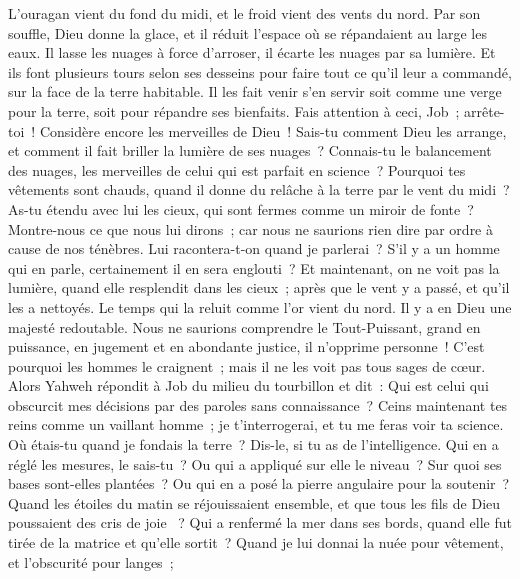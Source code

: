 \begin{multicols}{2}
L'ouragan vient du fond du midi, et le froid vient des vents du nord.
Par son souffle, Dieu donne la glace, et il réduit l'espace où se répandaient au large les eaux.
Il lasse les nuages à force d'arroser, il écarte les nuages par sa lumière.
Et ils font plusieurs tours selon ses desseins pour faire tout ce qu'il leur a commandé, sur la face de la terre habitable.
Il les fait venir s'en servir soit comme une verge pour la terre, soit pour répandre ses bienfaits.
Fais attention à ceci, Job~; arrête-toi~! Considère encore les merveilles de Dieu~!
Sais-tu comment Dieu les arrange, et comment il fait briller la lumière de ses nuages~?
Connais-tu le balancement des nuages, les merveilles de celui qui est parfait en science~?
Pourquoi tes vêtements sont chauds, quand il donne du relâche à la terre par le vent du midi~? 
As-tu étendu avec lui les cieux, qui sont fermes comme un miroir de fonte~? 
Montre-nous ce que nous lui dirons~; car nous ne saurions rien dire par ordre à cause de nos ténèbres. 
Lui racontera-t-on quand je parlerai~? S'il y a un homme qui en parle, certainement il en sera englouti~?
Et maintenant, on ne voit pas la lumière, quand elle resplendit dans les cieux~; après que le vent y a passé, et qu'il les a nettoyés.
Le temps qui la reluit comme l'or vient du nord. Il y a en Dieu une majesté redoutable.
Nous ne saurions comprendre le Tout-Puissant, grand en puissance, en jugement et en abondante justice, il n'opprime personne~!
C'est pourquoi les hommes le craignent~; mais il ne les voit pas tous sages de cœur.
\VerseOne{}Alors Yahweh répondit à Job du milieu du tourbillon et dit~:
Qui est celui qui obscurcit mes décisions par des paroles sans connaissance~?
Ceins maintenant tes reins comme un vaillant homme~; je t'interrogerai, et tu me feras voir ta science.
Où étais-tu quand je fondais la terre~? Dis-le, si tu as de l'intelligence.
Qui en a réglé les mesures, le sais-tu~? Ou qui a appliqué sur elle le niveau~?
Sur quoi ses bases sont-elles plantées~? Ou qui en a posé la pierre angulaire pour la soutenir~?
Quand les étoiles du matin se réjouissaient ensemble, et que tous les fils de Dieu poussaient des cris de joie ~?
Qui a renfermé la mer dans ses bords, quand elle fut tirée de la matrice et qu'elle sortit~? 
Quand je lui donnai la nuée pour vêtement, et l'obscurité pour langes~;

\end{multicols}
